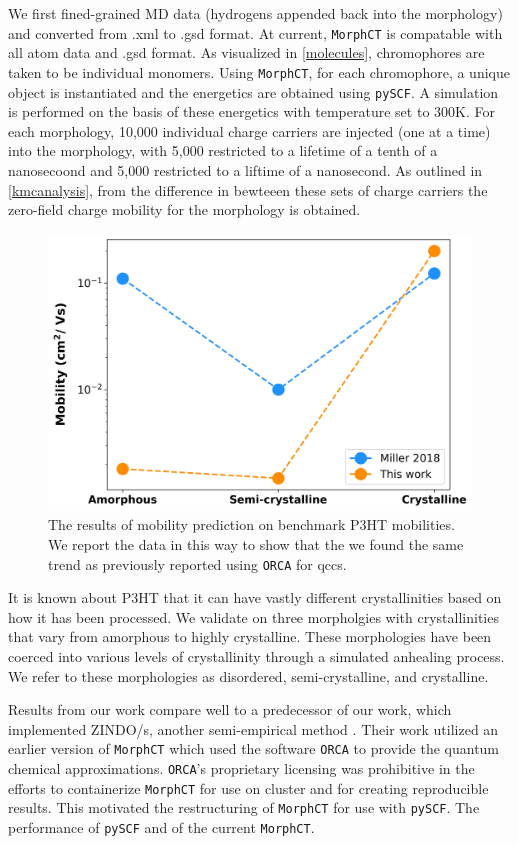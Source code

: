 We first fined-grained MD data (hydrogens appended back into
the morphology) and converted from .xml to .gsd format. At current, \texttt{MorphCT} is compatable with all atom data
and .gsd format. As visualized in \autoref{molecules}, chromophores are taken to be individual monomers. 
Using \texttt{MorphCT}, for each chromophore, a unique object is instantiated and the energetics are obtained using
\texttt{pySCF}. A  simulation is performed on the basis of these energetics with  temperature set to 300K. For
each morphology, 10,000 individual charge carriers are injected (one at a time) into the morphology, with
5,000 restricted to a lifetime of a tenth of a nanosecoond and 5,000 restricted to a liftime of a nanosecond.
As outlined in \autoref{kmcanalysis}, from the difference in  bewteeen these sets of charge carriers the
zero-field charge mobility for the morphology is obtained. 

\begin{figure}
  \center
  \includegraphics[width = .6\textwidth]{figures/validation.png}
  \caption{The results of mobility prediction on benchmark P3HT mobilities. We report the data in this way to
    show that the we found the same trend as previously reported using \texttt{ORCA} for \gls{qcc}s. }
  \label{mobility-validation}
\end{figure}

It is known about P3HT that it can have vastly different crystallinities based on how it has been processed. 
We validate on three morpholgies with crystallinities that vary from amorphous to highly crystalline. These morphologies have been coerced into various levels of crystallinity through a simulated anhealing process. 
We refer to these morphologies as disordered, semi-crystalline, and crystalline.

Results from our work compare well to a predecessor of our work, which implemented ZINDO/s, another
semi-empirical  method \cite{Miller2018a}\cite{jones2017}. 
Their work utilized an earlier version of \texttt{MorphCT} which used the  software 
\texttt{ORCA} \cite{Neese2012b} to provide the quantum chemical approximations. 
\texttt{ORCA}'s proprietary licensing was prohibitive in the efforts to containerize \texttt{MorphCT} for use on cluster and for
creating reproducible results. This motivated the restructuring of \texttt{MorphCT} for use with \texttt{pySCF}. The
performance of \texttt{pySCF} and of the current \texttt{MorphCT}.


